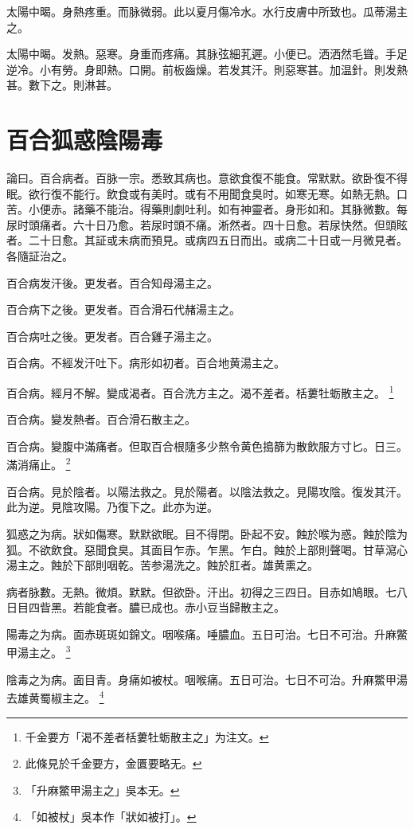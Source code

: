 \documentclass[b5paper,twoside,zihao=-4,UTF8]{ctexbook}
\begin{document}
太陽中暍。身熱疼重。而脉微弱。此以夏月傷冷水。水行皮膚中所致也。瓜蒂湯主之。

太陽中暍。发熱。惡寒。身重而疼痛。其脉弦細芤遲。小便已。洒洒然毛聳。手足逆冷。小有勞。身即熱。口開。前板齒燥。若发其汗。則惡寒甚。加温針。則发熱甚。數下之。則淋甚。

\chapter{百合狐惑陰陽毒}

論曰。百合病者。百脉一宗。悉致其病也。意欲食復不能食。常默默。欲卧{復}不得眠。欲行{復}不能行。飲食或有美时。或有不用聞食臭时。如寒无寒。如熱无熱。口苦。小便赤。諸藥不能治。得藥則劇吐利。如有神靈者。身形如和。其脉微數。每尿时頭痛者。六十日乃愈。若尿时頭不痛。淅然者。四十日愈。若尿快然。但頭眩者。二十日愈。其証或未病而預見。或病四五日而出。或病二十日或一月微見者。各隨証治之。

百合病发汗後{。更发}者。百合知母湯主之。

百合病下之後{。更发}者。百合滑石代赭湯主之。

百合病吐之後{。更发}者。百合雞子湯主之。

百合病。不經发汗吐下。病形如初者。百合地黄湯主之。

百合病。經月不解。變成渴者。百合洗方主之。渴不差者。栝蔞牡蛎散主之。
	\footnote{千金要方「渴不差者栝蔞牡蛎散主之」为注文。}

百合病。變发熱者。百合滑石散主之。

百合病。變腹中滿痛者。但取百合根隨多少熬令黄色搗篩为散飲服方寸匕。日三。滿消痛止。
	\footnote{此條見於千金要方，金匱要略无。}

百合病。見於陰者。以陽法救之。見於陽者。以陰法救之。見陽攻陰。復发其汗。此为逆。見陰攻陽。乃復下之。此亦为逆。

狐惑之为病。狀如傷寒。默默欲眠。目不得閉。卧起不安。蝕於喉为惑。蝕於陰为狐。不欲飲食。惡聞食臭。其面目乍赤。乍黑。乍白。蝕於上部則聲喝。甘草瀉心湯主之。蝕於下部則咽乾。苦参湯洗之。蝕於肛者。雄黄熏之。

病者脉數。无熱。微煩。默默。但欲卧。汗出。初得之三四日。目赤如鳩眼。七八日目四眥黑。若能食者。膿已成也。赤{小}豆当歸散主之。

陽毒之为病。面赤斑斑如錦文。咽喉痛。唾膿血。五日可治。七日不可治。升麻鱉甲湯主之。
	\footnote{「升麻鱉甲湯主之」吳本无。}

陰毒之为病。面目青。身痛如被杖。咽喉痛。五日可治。七日不可治。升麻鱉甲湯去雄黄蜀椒主之。
	\footnote{「如被杖」吳本作「狀如被打」。}
\end{document}

